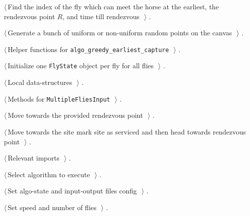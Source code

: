 \documentclass[11.5pt]{report}
\begin{document}
{\begin{list}{}{\setlength{\itemsep}{-\parsep}\setlength{\itemindent}{-\leftmargin}}
\item $\langle\,$Find the index of the fly  which can meet the horse at the earliest, the rendezvous point $R$, and time till rendezvous\nobreak\ {\footnotesize {}}$\,\rangle$ {\footnotesize {\NWtxtRefIn} .}
\item $\langle\,$Generate a bunch of uniform or non-uniform random points on the canvas\nobreak\ {\footnotesize {}}$\,\rangle$ {\footnotesize {\NWtxtRefIn} .}
\item $\langle\,$Helper functions for \verb|algo_greedy_earliest_capture|\nobreak\ {\footnotesize {}}$\,\rangle$ {\footnotesize {\NWtxtRefIn} .}
\item $\langle\,$Initialize one \verb|FlyState| object per fly for all flies\nobreak\ {\footnotesize {}}$\,\rangle$ {\footnotesize {\NWtxtRefIn} .}
\item $\langle\,$Local data-structures\nobreak\ {\footnotesize {}}$\,\rangle$ {\footnotesize {\NWtxtRefIn} .}
\item $\langle\,$Methods for \verb|MultipleFliesInput|\nobreak\ {\footnotesize {}}$\,\rangle$ {\footnotesize {\NWtxtRefIn} .}
\item $\langle\,$Move towards the provided rendezvous point\nobreak\ {\footnotesize {}}$\,\rangle$ {\footnotesize {\NWtxtRefIn} .}
\item $\langle\,$Move towards the site mark site as serviced and then head towards rendezvous point\nobreak\ {\footnotesize {}}$\,\rangle$ {\footnotesize {\NWtxtRefIn} .}
\item $\langle\,$Relevant imports\nobreak\ {\footnotesize {}}$\,\rangle$ {\footnotesize {\NWtxtRefIn} .}
\item $\langle\,$Select algorithm to execute\nobreak\ {\footnotesize {}}$\,\rangle$ {\footnotesize {\NWtxtRefIn} .}
\item $\langle\,$Set algo-state and input-output files config\nobreak\ {\footnotesize {}}$\,\rangle$ {\footnotesize {\NWtxtRefIn} .}
\item $\langle\,$Set speed and number of flies\nobreak\ {\footnotesize {}}$\,\rangle$ {\footnotesize {\NWtxtRefIn} .}

\end{list}}
\end{document}
